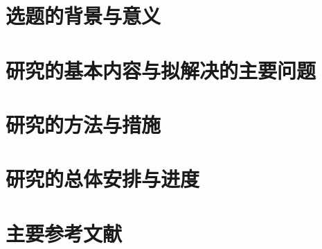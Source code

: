 \section{选题的背景与意义}

\lipsum[1]

\section{研究的基本内容与拟解决的主要问题}

\lipsum[2-4]

\section{研究的方法与措施}

\lipsum[5-7]

\section{研究的总体安排与进度}

\lipsum[8-11]

\section{主要参考文献}

